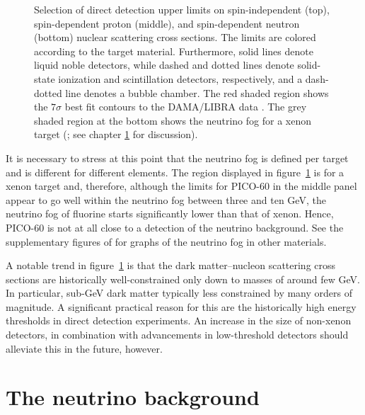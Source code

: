 \begin{figure}
    \vspace*{-1.0pc}
    \caption{Selection of direct detection upper limits on spin-independent (top), spin-dependent proton (middle), and spin-dependent neutron (bottom) nuclear scattering cross sections. The limits are colored according to the target material. Furthermore, solid lines denote liquid noble detectors, while dashed and dotted lines denote solid-state ionization and scintillation detectors, respectively, and a dash-dotted line denotes a bubble chamber. The red shaded region shows the $7\sigma$ best fit contours to the DAMA/LIBRA data \parencite{SavageEtAl2009}. The grey shaded region at the bottom shows the neutrino fog for a xenon target (\textcite{OHare2021}; see chapter \ref{chap:background} for discussion).}
    \label{fig:dd-reach}
\end{figure}

It is necessary to stress at this point that the neutrino fog is defined per target and is different for different elements. The region displayed in figure~\ref{fig:dd-reach} is for a xenon target and, therefore, although the limits for PICO-60 in the middle panel appear to go well within the neutrino fog between three and ten GeV, the neutrino fog of fluorine starts significantly lower than that of xenon. Hence, PICO-60 is not at all close to a detection of the neutrino background. See the supplementary figures of \textcite{OHare2021} for graphs of the neutrino fog in other materials.

A notable trend in figure~\ref{fig:dd-reach} is that the dark matter--nucleon scattering cross sections are historically well-constrained only down to masses of around few GeV. In particular, sub-GeV dark matter typically less constrained by many orders of magnitude. A significant practical reason for this are the historically high energy thresholds in direct detection experiments. An increase in the size of non-xenon detectors, in combination with advancements in low-threshold detectors should alleviate this in the future, however.

\chapter{The neutrino background}
\label{chap:background}

